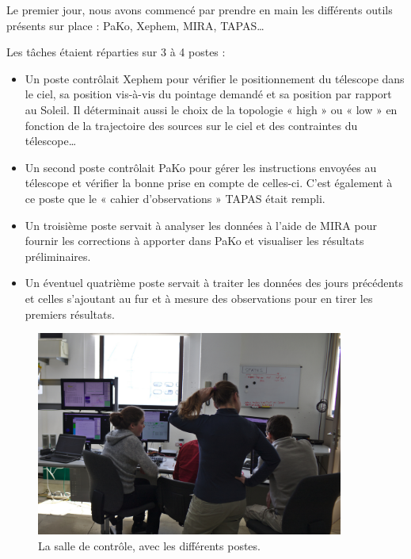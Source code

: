 \documentclass[a4paper,10pt,french]{article}
\begin{document}
Le premier jour, nous avons commencé par prendre en main les différents outils
présents sur place : PaKo, Xephem, MIRA, TAPAS…

Les tâches étaient réparties sur 3 à 4 postes :
\begin{itemize}
    \item Un poste contrôlait Xephem pour vérifier le positionnement du
          télescope dans le ciel, sa position vis-à-vis du
          pointage demandé et sa position par rapport au Soleil. Il déterminait aussi le
          choix de la topologie « high » ou « low » en fonction de la
          trajectoire des sources sur le ciel et des contraintes du télescope…
    \item Un second poste contrôlait PaKo pour gérer les instructions envoyées
          au télescope et vérifier la bonne prise en compte de celles-ci. C’est
          également à ce poste que le « cahier d’observations » TAPAS était
          rempli.
    \item Un troisième poste servait à analyser les données à l’aide de MIRA
          pour fournir les corrections à apporter dans PaKo et visualiser les
          résultats préliminaires.
    \item Un éventuel quatrième poste servait à traiter les données des jours
          précédents et celles s’ajoutant au fur et à mesure des observations
          pour en tirer les premiers résultats.
\end{itemize}

\begin{figure}[ht]
    \centering
    \includegraphics[width=0.9\textwidth]{control_room.jpg}
    \caption{La salle de contrôle, avec les différents postes.}
\end{figure}
\end{document}
